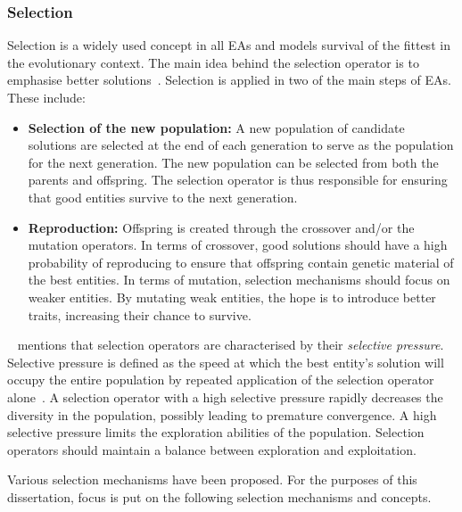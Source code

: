 \subsubsection{Selection}
\label{sec:heuristics:mh:ga:selection}

Selection is a widely used concept in all \acp{EA} and models survival of the fittest in the evolutionary context. The main idea behind the selection operator is to emphasise better solutions~\cite{ref:engelbrecht:2007}. Selection is applied in two of the main steps of \acp{EA}. These include:

\begin{itemize}
      \item \textbf{Selection of the new population:} A new population of candidate solutions are selected at the end of each generation to serve as the population for the next generation. The new population can be selected from both the parents and offspring. The selection operator is thus responsible for ensuring that good entities survive to the next generation.

      \item \textbf{Reproduction:} Offspring is created through the crossover and/or the mutation operators. In terms of crossover, good solutions should have a high probability of reproducing to ensure that offspring contain genetic material of the best entities. In terms of mutation, selection mechanisms should focus on weaker entities. By mutating weak entities, the hope is to introduce better traits, increasing their chance to survive.
\end{itemize}

\citeauthor{ref:engelbrecht:2007}~\cite{ref:engelbrecht:2007} mentions that selection operators are characterised by their \textit{selective pressure}. Selective pressure is defined as the speed at which the best entity's solution will occupy the entire population by repeated application of the selection operator alone~\cite{ref:back:1994}. A selection operator with a high selective pressure rapidly decreases the diversity in the population, possibly leading to premature convergence. A high selective pressure limits the exploration abilities of the population. Selection operators should maintain a balance between exploration and exploitation.

Various selection mechanisms have been proposed. For the purposes of this dissertation, focus is put on the following selection mechanisms and concepts.

